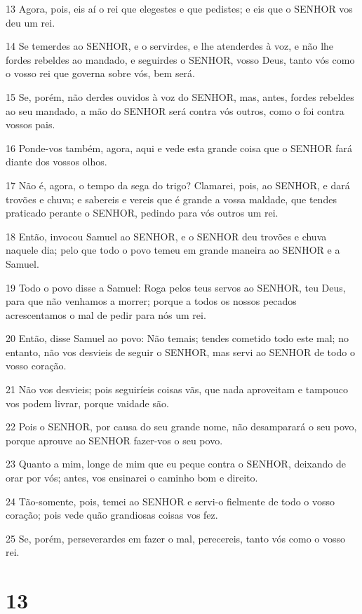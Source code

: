 \par 13 Agora, pois, eis aí o rei que elegestes e que pedistes; e eis que o SENHOR vos deu um rei.
\par 14 Se temerdes ao SENHOR, e o servirdes, e lhe atenderdes à voz, e não lhe fordes rebeldes ao mandado, e seguirdes o SENHOR, vosso Deus, tanto vós como o vosso rei que governa sobre vós, bem será.
\par 15 Se, porém, não derdes ouvidos à voz do SENHOR, mas, antes, fordes rebeldes ao seu mandado, a mão do SENHOR será contra vós outros, como o foi contra vossos pais.
\par 16 Ponde-vos também, agora, aqui e vede esta grande coisa que o SENHOR fará diante dos vossos olhos.
\par 17 Não é, agora, o tempo da sega do trigo? Clamarei, pois, ao SENHOR, e dará trovões e chuva; e sabereis e vereis que é grande a vossa maldade, que tendes praticado perante o SENHOR, pedindo para vós outros um rei.
\par 18 Então, invocou Samuel ao SENHOR, e o SENHOR deu trovões e chuva naquele dia; pelo que todo o povo temeu em grande maneira ao SENHOR e a Samuel.
\par 19 Todo o povo disse a Samuel: Roga pelos teus servos ao SENHOR, teu Deus, para que não venhamos a morrer; porque a todos os nossos pecados acrescentamos o mal de pedir para nós um rei.
\par 20 Então, disse Samuel ao povo: Não temais; tendes cometido todo este mal; no entanto, não vos desvieis de seguir o SENHOR, mas servi ao SENHOR de todo o vosso coração.
\par 21 Não vos desvieis; pois seguiríeis coisas vãs, que nada aproveitam e tampouco vos podem livrar, porque vaidade são.
\par 22 Pois o SENHOR, por causa do seu grande nome, não desamparará o seu povo, porque aprouve ao SENHOR fazer-vos o seu povo.
\par 23 Quanto a mim, longe de mim que eu peque contra o SENHOR, deixando de orar por vós; antes, vos ensinarei o caminho bom e direito.
\par 24 Tão-somente, pois, temei ao SENHOR e servi-o fielmente de todo o vosso coração; pois vede quão grandiosas coisas vos fez.
\par 25 Se, porém, perseverardes em fazer o mal, perecereis, tanto vós como o vosso rei.

\chapter{13}

